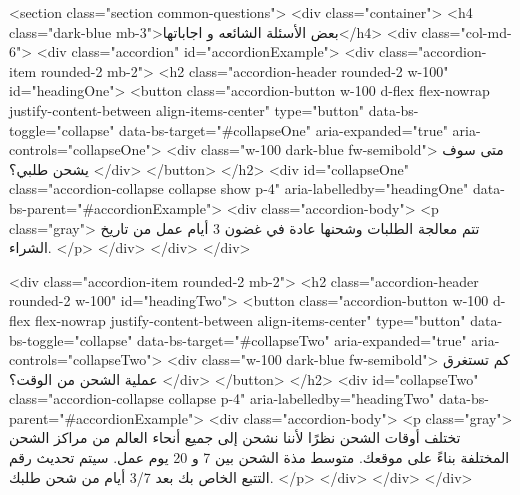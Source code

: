     <section class="section common-questions">
      <div class="container">
        <h4 class="dark-blue mb-3">بعض الأسئلة الشائعه و اجاباتها</h4>
        <div class="col-md-6">
          <div class="accordion" id="accordionExample">
            <div class="accordion-item rounded-2 mb-2">
              <h2 class="accordion-header rounded-2 w-100" id="headingOne">
                <button class="accordion-button w-100 d-flex flex-nowrap justify-content-between align-items-center"
                  type="button" data-bs-toggle="collapse" data-bs-target="#collapseOne" aria-expanded="true"
                  aria-controls="collapseOne">
                  <div class="w-100 dark-blue fw-semibold">
                    متى سوف يشحن طلبي؟
                  </div>
                </button>
              </h2>
              <div id="collapseOne" class="accordion-collapse collapse show p-4" aria-labelledby="headingOne"
                data-bs-parent="#accordionExample">
                <div class="accordion-body">
                  <p class="gray">
                    تتم معالجة الطلبات وشحنها عادة في غضون 3 أيام عمل من تاريخ
                    الشراء.
                  </p>
                </div>
              </div>
            </div>

            <div class="accordion-item rounded-2 mb-2">
              <h2 class="accordion-header rounded-2 w-100" id="headingTwo">
                <button class="accordion-button w-100 d-flex flex-nowrap justify-content-between align-items-center"
                  type="button" data-bs-toggle="collapse" data-bs-target="#collapseTwo" aria-expanded="true"
                  aria-controls="collapseTwo">
                  <div class="w-100 dark-blue fw-semibold">
                    كم تستغرق عملية الشحن من الوقت؟
                  </div>
                </button>
              </h2>
              <div id="collapseTwo" class="accordion-collapse collapse p-4" aria-labelledby="headingTwo"
                data-bs-parent="#accordionExample">
                <div class="accordion-body">
                  <p class="gray">
                    تختلف أوقات الشحن نظرًا لأننا نشحن إلى جميع أنحاء العالم من
                    مراكز الشحن المختلفة بناءً على موقعك. متوسط مذة الشحن بين 7
                    و 20 يوم عمل. سيتم تحديث رقم التتبع الخاص بك بعد 3/7 أيام من
                    شحن طلبك.
                  </p>
                </div>
              </div>
            </div>

